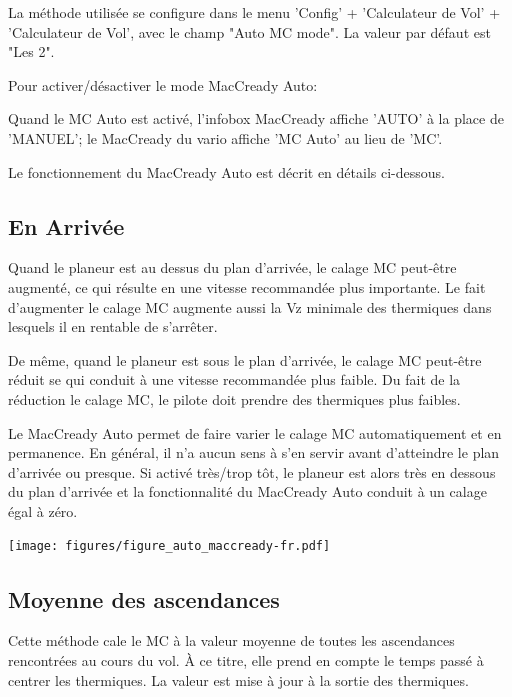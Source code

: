 La méthode utilisée se configure dans le menu 'Config' + 'Calculateur de Vol' + 'Calculateur de Vol', avec le champ "Auto MC mode". La valeur par défaut est "Les 2".

Pour activer/désactiver le mode MacCready Auto:
\begin{quote}
\blink{}
\end{quote}

Quand le MC Auto est activé, l'infobox MacCready affiche 'AUTO' à la place de 'MANUEL'; le MacCready du vario affiche 'MC Auto' au lieu de 'MC'.

Le fonctionnement du MacCready Auto est décrit en détails ci-dessous.

\subsection*{En Arrivée}
Quand le planeur est au dessus du plan d'arrivée, le calage MC peut-être augmenté, ce qui résulte en une vitesse recommandée plus importante. Le fait d'augmenter le calage MC augmente aussi la Vz minimale des thermiques dans lesquels il en rentable de s'arrêter.

De même, quand le planeur est sous le plan d'arrivée, le calage MC peut-être réduit se qui conduit à une vitesse recommandée plus faible. Du fait de la réduction le calage MC, le pilote doit prendre des thermiques plus faibles.

Le MacCready Auto permet de faire varier le calage MC automatiquement et en permanence. En général, il n'a aucun sens à s'en servir avant d'atteindre le plan d'arrivée ou presque. Si activé très/trop tôt, le planeur est alors très en dessous du plan d'arrivée et la fonctionnalité du MacCready Auto conduit à un calage égal à zéro.

\begin{maxipage}
\begin{center}
\texttt{[image: figures/figure\_auto\_maccready-fr.pdf]}
\end{center}
\end{maxipage}

\subsection*{Moyenne des ascendances}

Cette méthode cale le MC à la valeur moyenne de toutes les ascendances rencontrées au cours du vol. À ce titre, elle prend en compte le temps passé à centrer les thermiques. La valeur est mise à jour à la sortie des thermiques.

